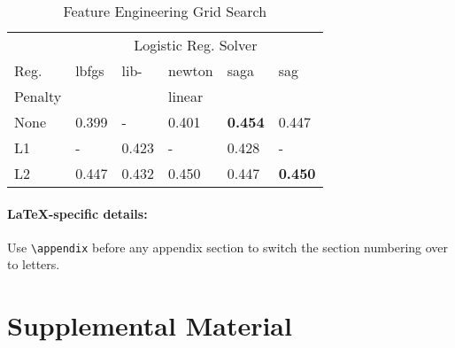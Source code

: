 \documentclass[11pt,a4paper]{article}
\begin{document}


\begin{table}[h]
    \centering
    \caption{Feature Engineering Grid Search}
    \begin{tabular}{
    	l
        l
        l
        l
        l
        l
        }
        \toprule
        \multicolumn{1}{c}{} &
        \multicolumn{5}{c}{Logistic Reg. Solver}\\
        \cmidrule(lr){2-6} 
        {Reg.}& {lbfgs} &{lib-} &{newton}&{saga}& {sag}\\
        {Penalty} & {} && {linear}&&{}\\
        \midrule
        None & 0.399 & - & 0.401 & \textbf{0.454} & 0.447\\
        L1 & - & 0.423 &  -&0.428& -\\
        L2 & 0.447& 0.432& 0.450& 0.447& \textbf{0.450}\\
        \bottomrule
    \end{tabular}
\end{table}








\appendix

\paragraph{\LaTeX-specific details:}
Use {\small\verb|\appendix|} before any appendix section to switch the section numbering over to letters.


\section{Supplemental Material}
\end{document}
